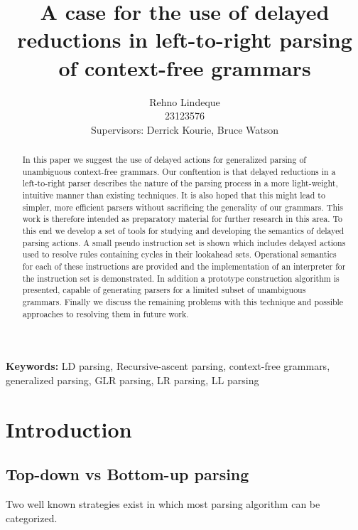 \documentclass[11pt]{article}
\begin{document}
\title{A case for the use of delayed reductions in left-to-right parsing of context-free grammars}
\author{Rehno Lindeque
\\23123576
\\Supervisors: Derrick Kourie, Bruce Watson}

\maketitle

\begin{abstract}
In this paper we suggest the use of delayed actions for generalized parsing of unambiguous context-free grammars. 
Our conftention is that delayed reductions in a left-to-right parser describes the nature of the parsing process in a more light-weight, intuitive manner than existing techniques.
It is also hoped that this might lead to simpler, more efficient parsers without sacrificing the generality of our grammars.
This work is therefore intended as preparatory material for further research in this area.
To this end we develop a set of tools for studying and developing the semantics of delayed parsing actions.
A small pseudo instruction set is shown which includes delayed actions used to resolve rules containing cycles in their lookahead sets.
Operational semantics for each of these instructions are provided and the implementation of an interpreter for the instruction set is demonstrated.
In addition a prototype construction algorithm is presented, capable of generating parsers for a limited subset of unambiguous grammars.
Finally we discuss the remaining problems with this technique and possible approaches to resolving them in future work.\\
\end{abstract}

\textbf{Keywords:} LD parsing, Recursive-ascent parsing, context-free grammars, generalized parsing, GLR parsing, LR parsing, LL parsing

\section{Introduction}

\subsection{Top-down vs Bottom-up parsing}

Two well known strategies exist in which most parsing algorithm can be categorized.
\end{document}
